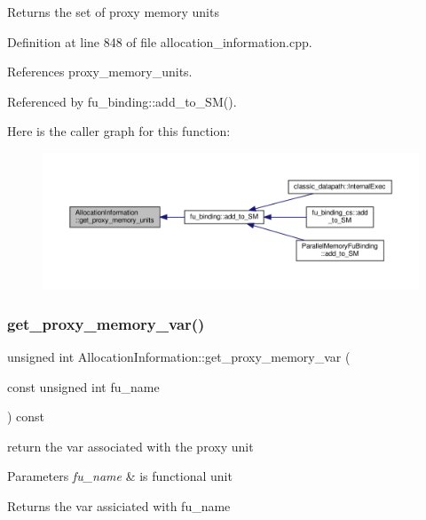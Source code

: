 \begin{DoxyReturn}{Returns}
the set of proxy memory units 
\end{DoxyReturn}


Definition at line 848 of file allocation\+\_\+information.\+cpp.



References proxy\+\_\+memory\+\_\+units.



Referenced by fu\+\_\+binding\+::add\+\_\+to\+\_\+\+S\+M().

Here is the caller graph for this function\+:
\nopagebreak
\begin{figure}[H]
\begin{center}
\leavevmode
\includegraphics[width=350pt]{d7/d79/classAllocationInformation_afb4a53f5f1daeffafcacd5a2a821234c_icgraph}
\end{center}
\end{figure}
\mbox{\label{classAllocationInformation_a9e8ab22244016fcbcb7f6ef2f8934054}} 
\subsubsection{\texorpdfstring{get\+\_\+proxy\+\_\+memory\+\_\+var()}{get\_proxy\_memory\_var()}}
{\footnotesize\ttfamily unsigned int Allocation\+Information\+::get\+\_\+proxy\+\_\+memory\+\_\+var (\begin{DoxyParamCaption}\item[{const unsigned int}]{fu\+\_\+name }\end{DoxyParamCaption}) const}



return the var associated with the proxy unit 


\begin{DoxyParams}{Parameters}
{\em fu\+\_\+name} & is functional unit \\
\hline
\end{DoxyParams}
\begin{DoxyReturn}{Returns}
the var assiciated with fu\+\_\+name 
\end{DoxyReturn}


